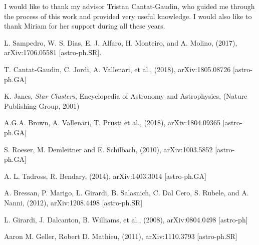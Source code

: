 \documentclass[twocolumn]{revtex4}
\begin{document}
\vspace*{0.5cm}
\begin{acknowledgments}
I would like to thank my advisor Tristan Cantat-Gaudin, who guided me through the process of this work and provided very useful knowledge. I would also like to thank Miriam for her support during all these years.
\end{acknowledgments}


\begin{thebibliography}{99}

 L. Sampedro, W. S. Dias, E. J. Alfaro, H. Monteiro, and A. Molino, (2017), arXiv:1706.05581 [astro-ph.SR].

 T. Cantat-Gaudin, C. Jordi, A. Vallenari, et al., (2018), arXiv:1805.08726 [astro-ph.GA]

 K. Janes, \textsl{Star Clusters}, Encyclopedia of Astronomy and Astrophysics, (Nature Publishing Group, 2001)

 A.G.A. Brown, A. Vallenari, T. Prusti et al., (2018), arXiv:1804.09365 [astro-ph.GA]

 S. Roeser, M. Demleitner and E. Schilbach, (2010), arXiv:1003.5852 [astro-ph.GA]

 A. L. Tadross, R. Bendary, (2014), arXiv:1403.3014 [astro-ph.GA]

 A. Bressan, P. Marigo, L. Girardi, B. Salasnich, C. Dal Cero, S. Rubele, and A. Nanni, (2012), arXiv:1208.4498 [astro-ph.SR]

 L. Girardi, J. Dalcanton, B. Williams, et al., (2008), arXiv:0804.0498 [astro-ph]

 Aaron M. Geller, Robert D. Mathieu, (2011), arXiv:1110.3793 [astro-ph.SR]


\end{thebibliography}
\end{document}
